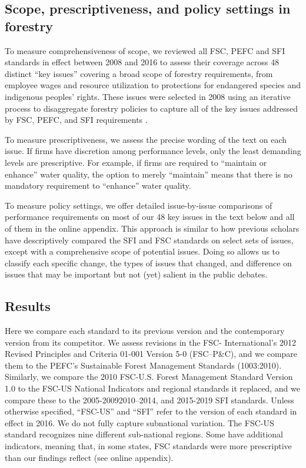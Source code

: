 \documentclass[
      12pt,
            Review ]{article}
\begin{document}
\subsection{Scope, prescriptiveness, and policy settings in
forestry}\label{scope-prescriptiveness-and-policy-settings-in-forestry}

To measure comprehensiveness of scope, we reviewed all FSC, PEFC and SFI
standards in effect between 2008 and 2016 to assess their coverage
across 48 distinct ``key issues'' covering a broad scope of forestry
requirements, from employee wages and resource utilization to
protections for endangered species and indigenous peoples' rights. These
issues were selected in 2008 using an iterative process to disaggregate
forestry policies to capture all of the key issues addressed by FSC,
PEFC, and SFI requirements \citep{McDermott2010}.

To measure prescriptiveness, we assess the precise wording of the text
on each issue. If firms have discretion among performance levels, only
the least demanding levels are prescriptive. For example, if firms are
required to ``maintain or enhance'' water quality, the option to merely
``maintain'' means that there is no mandatory requirement to ``enhance''
water quality.

To measure policy settings, we offer detailed issue-by-issue comparisons
of performance requirements on most of our 48 key issues in the text
below and all of them in the online appendix. This approach is similar
to how previous scholars have descriptively compared the SFI and FSC
standards on select sets of issues, except with a comprehensive scope of
potential issues. Doing so allows us to classify each specific change,
the types of issues that changed, and difference on issues that may be
important but not (yet) salient in the public debates.

\subsection{Results}\label{results}

Here we compare each standard to its previous version and the
contemporary version from its competitor. We assess revisions in the
FSC- International's 2012 Revised Principles and Criteria 01-001 Version
5-0 (FSC--P\&C), and we compare them to the PEFC's Sustainable Forest
Management Standards (1003:2010). Similarly, we compare the 2010
FSC-U.S. Forest Management Standard Version 1.0 to the FSC-US National
Indicators and regional standards it replaced, and we compare these to
the 2005-20092010--2014, and 2015-2019 SFI standards. Unless otherwise
specified, ``FSC-US'' and ``SFI'' refer to the version of each standard
in effect in 2016. We do not fully capture subnational variation. The
FSC-US standard recognizes nine different sub-national regions. Some
have additional indicators, meaning that, in some states, FSC standards
were more prescriptive than our findings reflect (see online appendix).
\end{document}
